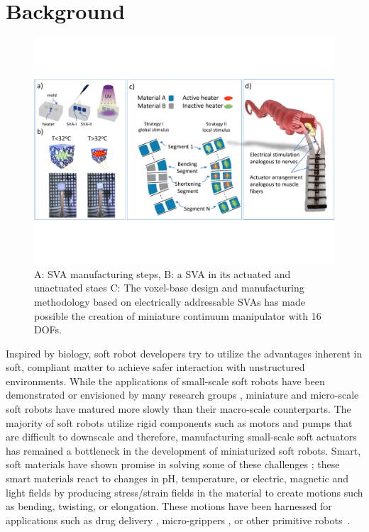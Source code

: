 \section{Background}
\begin{figure}[t]
      \centering
      \includegraphics[width=\textwidth]{concept4.pdf}
      \caption{A: SVA manufacturing steps, B: a SVA in its actuated and unactuated staes C: The voxel-base design and manufacturing methodology based on electrically addressable SVAs has made possible the creation of miniature continuum manipulator with 16 DOFs.}
      \label{fig:conceptSVA}
\end{figure}
Inspired by biology, soft robot developers try to utilize the advantages inherent in soft, compliant matter to achieve safer interaction with unstructured environments.  
While the applications of small-scale soft robots have been demonstrated or envisioned by many research groups \cite{hines2017soft}, miniature and micro-scale soft robots have matured more slowly than their  macro-scale counterparts. The majority of soft robots utilize rigid components such as motors and pumps that are difficult to downscale \cite{majidi2019soft} and therefore, manufacturing small-scale soft actuators has remained a bottleneck in the development of miniaturized soft robots. Smart, soft materials have shown promise in solving some of these challenges \cite{steele2018stimuli, stuart2010emerging,white2013advances}; these smart materials react to changes in pH, temperature, or electric, magnetic and light fields by producing stress/strain fields in the material to create motions such as bending, twisting, or elongation. These motions have been harnessed for applications such as drug delivery \cite{ghosh2017stimuli}, micro-grippers \cite{shintake2018soft}, or other primitive robots~\cite{ionov2014hydrogel}. %
